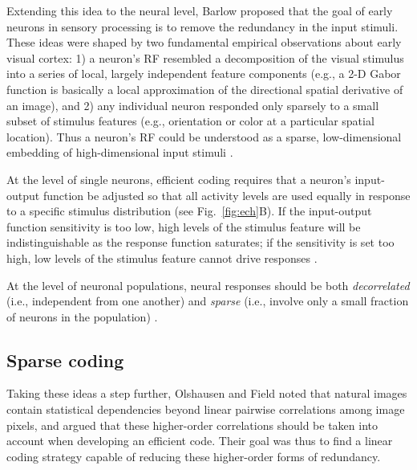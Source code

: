 Extending this idea to the neural level,
Barlow \cite{Barlow1961} proposed that
the goal of early neurons in sensory processing is to remove
the redundancy in the input stimuli.
These ideas were shaped by two
fundamental empirical observations
about early visual cortex:
1) a neuron's \ac{RF} resembled a decomposition of the visual
stimulus into a series of local, largely independent feature components
(e.g., a 2-D Gabor function is basically a local approximation of the
directional spatial derivative of an image),
and 2) any individual neuron responded only sparsely to a small subset of
stimulus features (e.g., orientation or color at a particular spatial location).
Thus a neuron's \ac{RF} could be understood as a
sparse, low-dimensional embedding of high-dimensional input stimuli
\cite{Barbieri2015}.

At the level of single neurons, efficient coding requires
that a neuron's input-output function be adjusted so that all
activity levels are used equally in response to a specific
stimulus distribution \cite{Simoncelli2003} (see Fig.~\ref{fig:ech}B).
If the input-output function sensitivity is too low,
high levels of the stimulus feature will be indistinguishable
as the response function saturates; if the sensitivity is set too high,
low levels of the stimulus feature cannot drive responses 
\cite{Laughlin1981}.

At the level of neuronal populations,
neural responses should be both \emph{decorrelated}
(i.e., independent from one another)
and \emph{sparse}
(i.e., involve only a small fraction of neurons in the population)
\cite{LouieGlimcher2012}.


\subsection*{Sparse coding}

Taking these ideas a step further,
Olshausen and Field \cite{OlshausenField1996b} 
noted that natural images contain statistical
dependencies beyond linear pairwise correlations among image pixels,
and argued that these higher-order correlations should be taken into
account when developing an efficient code.
Their goal was thus to find a linear coding strategy
capable of reducing these higher-order forms of redundancy.

